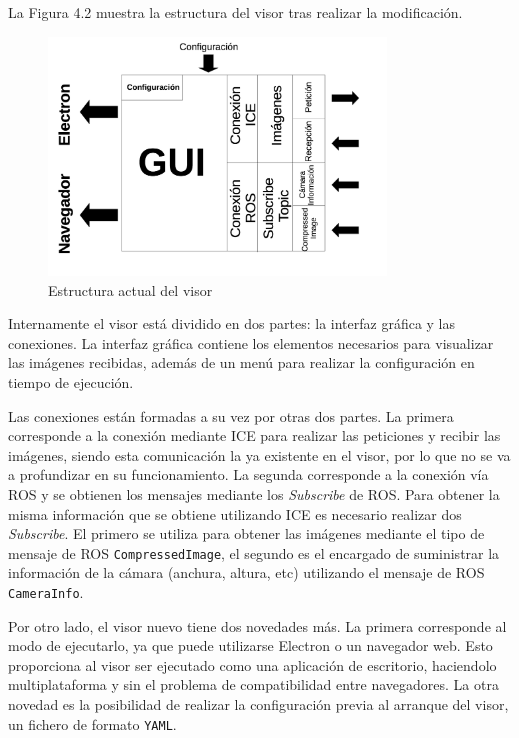 La Figura 4.2 muestra la estructura del visor tras realizar la modificación.

\begin{figure}[H]
  \begin{center}
    \includegraphics[width=0.8\textwidth]{figures/Camviz2.png}
		\caption{Estructura actual del visor}
		\label{fig.estructuracamviz2}
		\end{center}
\end{figure}

Internamente el visor está dividido en dos partes: la interfaz gráfica y las conexiones. La interfaz gráfica contiene los elementos necesarios para visualizar las imágenes recibidas, además de un menú para realizar la configuración en tiempo de ejecución.

Las conexiones están formadas a su vez por otras dos partes. La primera corresponde a la conexión mediante ICE para realizar las peticiones y recibir las imágenes, siendo esta comunicación la ya existente en el visor, por lo que no se va a profundizar en su funcionamiento. La segunda corresponde a la conexión vía ROS y se obtienen los mensajes mediante los \textit{Subscribe} de ROS. Para obtener la misma información que se obtiene utilizando ICE es necesario realizar dos \textit{Subscribe}. El primero se utiliza para obtener las imágenes mediante el tipo de mensaje de ROS \texttt{CompressedImage}, el segundo es el encargado de suministrar la información de la cámara (anchura, altura, etc) utilizando el mensaje de ROS \texttt{CameraInfo}.

Por otro lado, el visor nuevo tiene dos novedades más. La primera corresponde al modo de ejecutarlo, ya que puede utilizarse Electron o un navegador web. Esto proporciona al visor ser ejecutado como una aplicación de escritorio, haciendolo multiplataforma y sin el problema de compatibilidad entre navegadores. La otra novedad es la posibilidad de realizar la configuración previa al arranque del visor, un fichero de formato \texttt{YAML}.

